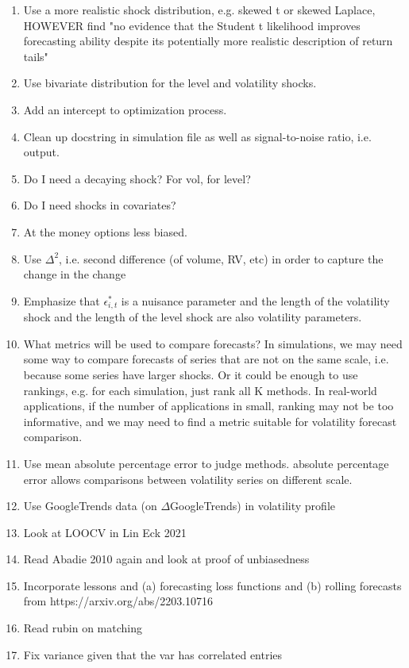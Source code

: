 \documentclass[11pt]{article}
\theoremstyle{definition}
\begin{document}
\begin{enumerate}
\item Use a more realistic shock distribution, e.g. skewed t or skewed Laplace, HOWEVER \citep{brownlees2011practical} find "no evidence
that the Student t likelihood improves forecasting ability despite its potentially more realistic
description of return tails"
\item Use bivariate distribution for the level and volatility shocks.
\item Add an intercept to optimization process.
\item Clean up docstring in simulation file as well as signal-to-noise ratio, i.e. output.
\item Do I need a decaying shock?  For vol, for level?
\item Do I need shocks in covariates? 
\item At the money options less biased.
\item Use $\Delta^{2}$, i.e. second difference (of volume, RV, etc) in order to capture the change in the change
\item Emphasize that $\epsilon^{*}_{i,t}$ is a nuisance parameter and the length of the volatility shock and the length of the level shock are also volatility parameters.
\item What metrics will be used to compare forecasts?  In simulations, we may need some way to compare forecasts of series that are not on the same scale, i.e. because some series have larger shocks.  Or it could be enough to use rankings, e.g. for each simulation, just rank all K methods.  In real-world applications, if the number of applications in small, ranking may not be too informative, and we may need to find a metric suitable for volatility forecast comparison.  
\item Use mean absolute percentage error to judge methods.  absolute percentage error allows comparisons between volatility series on different scale.
\item Use GoogleTrends data (on $\Delta$GoogleTrends) in volatility profile
\item Look at LOOCV in Lin Eck 2021
\item Read Abadie 2010 again and look at proof of unbiasedness
\item Incorporate lessons and (a) forecasting loss functions and (b) rolling forecasts from https://arxiv.org/abs/2203.10716
\item Read rubin on matching
\item Fix variance given that the var has correlated entries

\end{enumerate}
\end{document}
